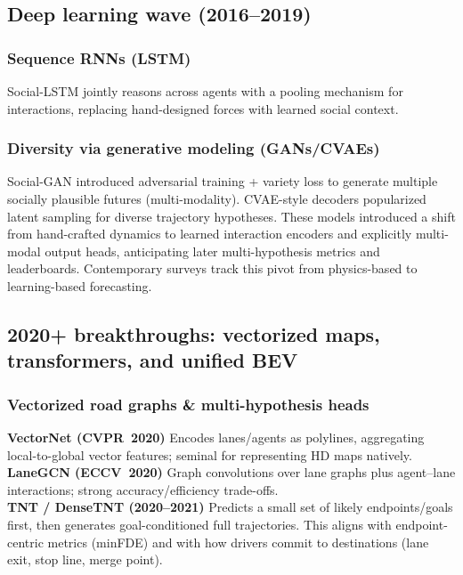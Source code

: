\documentclass[12pt,a4paper]{report}
\begin{document}
\subsection{Deep learning wave (2016–2019)}

\subsubsection{Sequence RNNs (LSTM)}
\quad Social-LSTM jointly reasons across agents with a pooling mechanism for interactions, replacing hand-designed forces with learned social context. \cite{Alahi2016SocialLSTM}

\subsubsection{Diversity via generative modeling (GANs/CVAEs)}
\quad Social-GAN introduced adversarial training + variety loss to generate multiple socially plausible futures (multi-modality). CVAE-style decoders popularized latent sampling for diverse trajectory hypotheses.
These models introduced a shift from hand-crafted dynamics to learned interaction encoders and explicitly multi-modal output heads, anticipating later multi-hypothesis metrics and leaderboards. Contemporary surveys track this pivot from physics-based to learning-based forecasting. \cite{Gupta2018SocialGAN}


\subsection{2020+ breakthroughs: vectorized maps, transformers, and unified BEV}

\subsubsection{Vectorized road graphs \& multi-hypothesis heads}

\quad \textbf{VectorNet (CVPR~2020)} Encodes lanes/agents as polylines, aggregating local-to-global vector features; seminal for representing HD maps natively. \cite{VectorNet2020} \\

\textbf{LaneGCN (ECCV~2020)} Graph convolutions over lane graphs plus agent–lane interactions; strong accuracy/efficiency trade-offs. \cite{Liang2020LaneGCN} \\

\textbf{TNT / DenseTNT (2020--2021)} Predicts a small set of likely endpoints/goals first, then generates goal-conditioned full trajectories. This aligns with endpoint-centric metrics (minFDE) and with how drivers commit to destinations (lane exit, stop line, merge point). \cite{TNT2020,DenseTNT2021}\\
\end{document}
